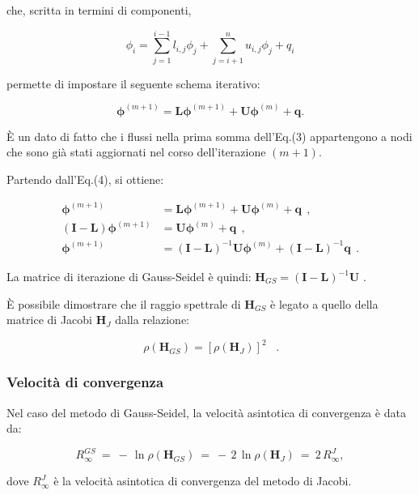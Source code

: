 che, scritta in termini di componenti,

\begin{equation}
	\phi_i = \sum_{j=1}^{i-1} l_{i,j} \phi_j + \sum_{j=i+1}^n u_{i,j} \phi_j + q_i \tag{3}
\end{equation}

permette di impostare il seguente schema iterativo:

\begin{equation}
	\mathbf{\phi}^{(m+1)} = \mathbf{L} \mathbf{\phi}^{(m+1)} + \mathbf{U} \mathbf{\phi}^{(m)} + \mathbf{q}. \tag{4}
\end{equation}

È un dato di fatto che i flussi nella prima somma dell'Eq.(3) appartengono a nodi che sono già stati aggiornati nel corso dell'iterazione $(m+1)$.

Partendo dall'Eq.(4), si ottiene:

\[ \begin{aligned}
\mathbf{\phi}^{(m+1)} &= \mathbf{L} \mathbf{\phi}^{(m+1)} + \mathbf{U} \mathbf{\phi}^{(m)} + \mathbf{q}\ \ ,\\
(\mathbf{I} - \mathbf{L}) \mathbf{\phi}^{(m+1)} &= \mathbf{U} \mathbf{\phi}^{(m)} + \mathbf{q}\ \ ,\\
\mathbf{\phi}^{(m+1)} &= (\mathbf{I} - \mathbf{L})^{-1} \mathbf{U} \mathbf{\phi}^{(m)} + (\mathbf{I} - \mathbf{L})^{-1} \mathbf{q}\ \ . 
\end{aligned}\]

La matrice di iterazione di Gauss-Seidel è quindi: $\boxed{\mathbf{H}_{GS} = (\mathbf{I} - \mathbf{L})^{-1} \mathbf{U}}$ .

È possibile dimostrare che il raggio spettrale di \(\mathbf{H}_{GS}\) è legato a quello della matrice di Jacobi \(\mathbf{H}_J\) dalla relazione:

\[
\boxed{\,\rho(\mathbf{H}_{GS}) = \left[ \rho(\mathbf{H}_J) \right]^2\,}\ \ \ . 
\]

\subsubsection{Velocità di convergenza}

Nel caso del metodo di Gauss-Seidel, la velocità asintotica di convergenza è data da:

\[
R_{\infty}^{GS}\ =\ -\,\ln \rho(\mathbf{H}_{GS})\ =\ -\,2\, \ln \rho(\mathbf{H}_J)\ =\ 2\, R_{\infty}^{J}, 
\]

dove \(R_{\infty}^{J}\) è la velocità asintotica di convergenza del metodo di Jacobi.

